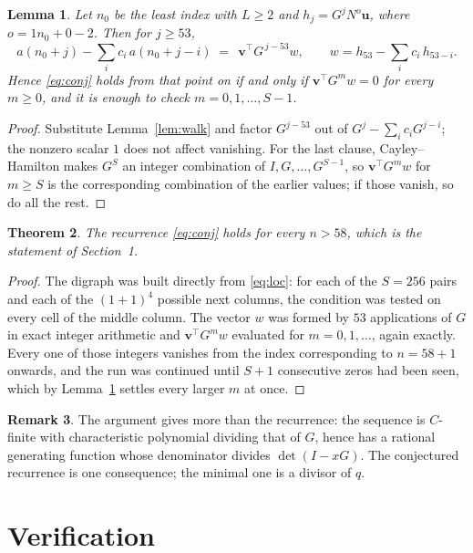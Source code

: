 \documentclass[11pt,a4paper]{article}
\theoremstyle{plain}
\newtheorem{theorem}{Theorem}
\newtheorem{lemma}[theorem]{Lemma}
\theoremstyle{definition}
\newtheorem{remark}[theorem]{Remark}
\begin{document}
\begin{lemma}\label{lem:crit}
Let $n_0$ be the least index with $L\ge2$ and $h_j=G^{j}N^{o}\mathbf{u}$, where
$o=1n_0+0-2$. Then for $j\ge53$,
\[
a(n_0+j)-\sum_i c_i\,a(n_0+j-i)\;=\;\,\mathbf{v}^{\!\top}G^{\,j-53}w,
\qquad w=h_{53}-\sum_i c_i\,h_{53-i} .
\]
Hence \eqref{eq:conj} holds from that point on if and only if
$\mathbf{v}^{\!\top}G^{m}w=0$ for every $m\ge0$, and it is enough to check
$m=0,1,\dots,S-1$.
\end{lemma}

\begin{proof}
Substitute Lemma~\ref{lem:walk} and factor $G^{j-53}$ out of
$G^{j}-\sum_ic_iG^{j-i}$; the nonzero scalar $1$ does not affect
vanishing. For the last clause, Cayley--Hamilton makes $G^{S}$ an integer combination of
$I,G,\dots,G^{S-1}$, so $\mathbf{v}^{\!\top}G^{m}w$ for $m\ge S$ is the corresponding
combination of the earlier values; if those vanish, so do all the rest.
\end{proof}

\begin{theorem}
The recurrence \eqref{eq:conj} holds for every $n>58$, which is the statement of
Section~1.
\end{theorem}

\begin{proof}
The digraph was built directly from \eqref{eq:loc}: for each of the $S=256$ pairs and each
of the $(1+1)^{4}$ possible next columns, the condition was tested on every cell of
the middle column. The vector $w$ was formed by $53$ applications of $G$ in exact integer
arithmetic and $\mathbf{v}^{\!\top}G^{m}w$ evaluated for $m=0,1,\dots$, again exactly.
Every one of those integers vanishes from the index corresponding to $n=58+1$ onwards,
and the run was continued until $S+1$ consecutive zeros had been seen, which by
Lemma~\ref{lem:crit} settles every larger $m$ at once.
\end{proof}

\begin{remark}
The argument gives more than the recurrence: the sequence is $C$-finite with characteristic
polynomial dividing that of $G$, hence has a rational generating function whose denominator
divides $\det(I-xG)$. The conjectured recurrence is one consequence; the minimal one is a
divisor of $q$.
\end{remark}

\section{Verification}
\end{document}
